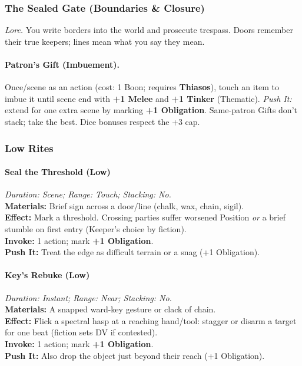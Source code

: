 
\subsubsection{The Sealed Gate (Boundaries \& Closure)}
\label{patron:sealed-gate}
\textit{Lore.} You write borders into the world and prosecute trespass. Doors remember their true keepers; lines mean what you say they mean.

\paragraph{Patron's Gift (Imbuement).}
Once/scene as an action (cost: 1 Boon; requires \textbf{Thiasos}), touch an item to imbue it until scene end with \textbf{+1 Melee} and \textbf{+1 Tinker} (Thematic). \emph{Push It:} extend for one extra scene by marking \textbf{+1 Obligation}. Same-patron Gifts don’t stack; take the best. Dice bonuses respect the +3 cap.

\subsubsection*{Low Rites}

\paragraph{Seal the Threshold (Low)}
\emph{Duration: Scene; Range: Touch; Stacking: No.}\\
\textbf{Materials:} Brief sign across a door/line (chalk, wax, chain, sigil).\\
\textbf{Effect:} Mark a threshold. Crossing parties suffer worsened Position \emph{or} a brief stumble on first entry (Keeper’s choice by fiction).\\
\textbf{Invoke:} 1 action; mark \textbf{+1 Obligation}.\\
\textbf{Push It:} Treat the edge as difficult terrain or a snag (+1 Obligation).

\paragraph{Key’s Rebuke (Low)}
\emph{Duration: Instant; Range: Near; Stacking: No.}\\
\textbf{Materials:} A snapped ward-key gesture or clack of chain.\\
\textbf{Effect:} Flick a spectral hasp at a reaching hand/tool: stagger or disarm a target for one beat (fiction sets DV if contested).\\
\textbf{Invoke:} 1 action; mark \textbf{+1 Obligation}.\\
\textbf{Push It:} Also drop the object just beyond their reach (+1 Obligation).

